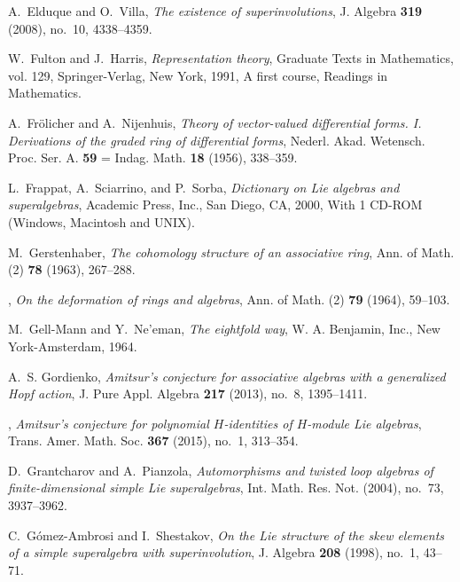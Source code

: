 \documentclass[12pt]{pdfathesis}
\begin{document}
\begin{thebibliography}{BHDSK17}
A.~Elduque and O.~Villa, \emph{The existence of superinvolutions}, J. Algebra
  \textbf{319} (2008), no.~10, 4338--4359. 

W.~Fulton and J.~Harris, \emph{Representation theory}, Graduate Texts in
  Mathematics, vol. 129, Springer-Verlag, New York, 1991, A first course,
  Readings in Mathematics. 

A.~Fr\"{o}licher and A.~Nijenhuis, \emph{Theory of vector-valued differential
  forms. {I}. {D}erivations of the graded ring of differential forms}, Nederl.
  Akad. Wetensch. Proc. Ser. A. {\bf 59} = Indag. Math. \textbf{18} (1956),
  338--359. 

L.~Frappat, A.~Sciarrino, and P.~Sorba, \emph{Dictionary on {L}ie algebras and
  superalgebras}, Academic Press, Inc., San Diego, CA, 2000, With 1 CD-ROM
  (Windows, Macintosh and UNIX). 

M.~Gerstenhaber, \emph{The cohomology structure of an associative ring}, Ann.
  of Math. (2) \textbf{78} (1963), 267--288. 

\bysame, \emph{On the deformation of rings and algebras}, Ann. of Math. (2)
  \textbf{79} (1964), 59--103. 

M.~Gell-Mann and Y.~Ne'eman, \emph{The eightfold way}, W. A. Benjamin, Inc.,
  New York-Amsterdam, 1964. 

A.~S. Gordienko, \emph{Amitsur's conjecture for associative algebras with a
  generalized {H}opf action}, J. Pure Appl. Algebra \textbf{217} (2013), no.~8,
  1395--1411. 

\bysame, \emph{Amitsur's conjecture for polynomial {$H$}-identities of
  {$H$}-module {L}ie algebras}, Trans. Amer. Math. Soc. \textbf{367} (2015),
  no.~1, 313--354. 

D.~Grantcharov and A.~Pianzola, \emph{Automorphisms and twisted loop algebras
  of finite-dimensional simple {L}ie superalgebras}, Int. Math. Res. Not.
  (2004), no.~73, 3937--3962. 

C.~G\'{o}mez-Ambrosi and I.~Shestakov, \emph{On the {L}ie structure of the skew
  elements of a simple superalgebra with superinvolution}, J. Algebra
  \textbf{208} (1998), no.~1, 43--71. 


\end{thebibliography}
\end{document}
